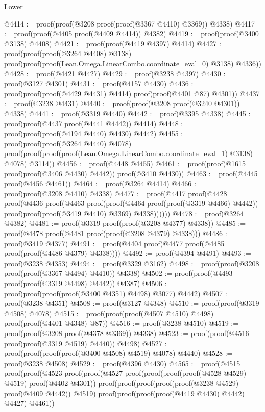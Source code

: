 \begin{lexlean}{Lower}
\begin{coremodule}
@4414 := proof(proof(@3208 proof(proof(@3367 @4410) @3369)) @4338)
@4417 := proof(proof(@4405 proof(@4409 @4414)) @4382)
@4419 := proof(proof(@3400 @3138) @4408)
@4421 := proof(proof(@4419 @4397) @4414)
@4427 := proof(proof(proof(@3264 @4408) @3138)
      proof(proof(proof(Lean.Omega.LinearCombo.coordinate_eval_0) @3138) @4336))
@4428 := proof(@4421 @4427)
@4429 := proof(@3238 @4397)
@4430 := proof(@3127 @4301)
@4431 := proof(@4157 @4430)
@4436 := proof(proof(proof(@4429 @4431) @4414) proof(proof(@4401 @87) @4301))
@4437 := proof(@3238 @4431)
@4440 := proof(proof(@3208 proof(@3240 @4301)) @4338)
@4441 := proof(@3319 @4440)
@4442 := proof(@3395 @4338)
@4445 := proof(proof(@4437 proof(@4441 @4442)) @4414)
@4448 := proof(proof(proof(@4194 @4440) @4430) @4442)
@4455 := proof(proof(proof(@3264 @4440) @4078)
      proof(proof(proof(proof(Lean.Omega.LinearCombo.coordinate_eval_1) @3138) @4078) @3114))
@4456 := proof(@4448 @4455)
@4461 := proof(proof(@1615 proof(proof(@3406 @4430) @4442)) proof(@3410 @4430))
@4463 := proof(@4445 proof(@4456 @4461))
@4464 := proof(@3264 @4414)
@4466 := proof(proof(@3208 @4410) @4338)
@4477 := proof(@4417
      proof(@4428
          proof(@4436
              proof(@4463
                  proof(proof(@4464 proof(proof(@3319 @4466) @4442))
                      proof(proof(proof(@3419 @4410) @3369) @4338))))))
@4478 := proof(@3264 @4382)
@4481 := proof(@3319 proof(proof(@3208 @4377) @4338))
@4485 := proof(@4478 proof(@4481 proof(proof(@3208 @4379) @4338)))
@4486 := proof(@3419 @4377)
@4491 := proof(@4404 proof(@4477 proof(@4485 proof(proof(@4486 @4379) @4338))))
@4492 := proof(@4394 @4491)
@4493 := proof(@3238 @4353)
@4494 := proof(@3329 @3162)
@4498 := proof(proof(@3208 proof(proof(@3367 @4494) @4410)) @4338)
@4502 := proof(proof(@4493 proof(proof(@3319 @4498) @4442)) @4387)
@4506 := proof(proof(proof(proof(@3400 @4351) @4498) @3077) @4442)
@4507 := proof(@3238 @4351)
@4508 := proof(@3127 @4348)
@4510 := proof(proof(@3319 @4508) @4078)
@4515 := proof(proof(proof(@4507 @4510) @4498) proof(proof(@4401 @4348) @87))
@4516 := proof(@3238 @4510)
@4519 := proof(proof(@3208 proof(@4378 @3369)) @4338)
@4523 := proof(proof(@4516 proof(proof(@3319 @4519) @4440)) @4498)
@4527 := proof(proof(proof(proof(@3400 @4508) @4519) @4078) @4440)
@4528 := proof(@3238 @4508)
@4529 := proof(@4396 @4430)
@4565 := proof(@4515
      proof(proof(@4523
            proof(proof(@4527
                  proof(proof(proof(proof(@4528 @4529) @4519) proof(@4402 @4301))
                      proof(proof(proof(proof(proof(@3238 @4529) proof(@4409 @4442)) @4519)
                            proof(proof(proof(proof(@4419 @4430) @4442) @4427) @4461))

\end{coremodule}
\end{lexlean}

